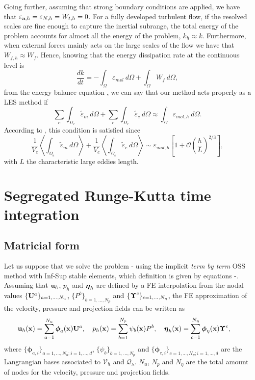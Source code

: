 Going further, assuming that strong boundary conditions are applied, we have that $ \varepsilon_{{\bf a},h}=\varepsilon_{N,h}=W_{t,h}=0 $. For a fully developed turbulent flow, if the resolved scales are fine enough to capture the inertial subrange, the total energy of the problem accounts for almost all the energy of the problem, $ k_h\approx k $. Furthermore, when external forces mainly acts on the large scales of the flow we have that $ W_{f,h}\approx W_f $. Hence, knowing that the energy dissipation rate at the continuous level is
$$ \frac{dk}{dt}=-\int_{\Omega}\varepsilon_{mol}\ d\Omega+\int_{\Omega}W_{f}\ d\Omega, $$
from the energy balance equation , we can say that our method acts properly as a LES method if
$$ \sum_e\int_{\Omega_e}\widetilde{\varepsilon}_m\ d\Omega+\sum_e\int_{\Omega_e}\widetilde{\varepsilon}_c\ d\Omega\approx\int_{\Omega}\varepsilon_{mol,h}\ d\Omega. $$
According to \cite{guasch_statistical_2013}, this condition is satisfied since 
$$ \frac{1}{V_e}\left\langle\int_{\Omega_e}\widetilde{\varepsilon}_m\ d\Omega\right\rangle + \frac{1}{V_e}\left\langle\int_{\Omega_e}\widetilde{\varepsilon}_c\ d\Omega\right\rangle\sim\varepsilon_{mol,h}\left[1+\mathcal{O}\left(\frac{h}{L}\right)^{2/3}\right], $$
with $ L $ the characteristic large eddies length.

\section{Segregated Runge-Kutta time integration}
\label{sec-C7_SRK}
\subsection{Matricial form}
Let us suppose that we solve the problem - using the implicit \textit{term by term} OSS method with Inf-Sup stable elements, which definition is given by equations -. Assuming that ${\bf u}_h$, $p_h$ and $\boldsymbol{\eta}_h$ are defined by a FE interpolation from the nodal values $\{{\bf U}^a\}_{a=1,...,N_u}$, $\{P^b\}_{b=1,...,N_p}$ and $\{\boldsymbol{\Upsilon}^c\}_{c=1,...,N_\eta}$, the FE approximation of the velocity, pressure and projection fields can be written as
\begin{align*}
&{\bf u}_h({\bf x})=\sum_{a=1}^{N_u}\boldsymbol{\phi}_a({\bf x}){\bf U}^a,\quad p_h({\bf x})=\sum_{b=1}^{N_p}\psi_b({\bf x})P^b,\quad \boldsymbol{\eta}_h({\bf x})=\sum_{c=1}^{N_\eta}\boldsymbol{\phi}_\eta({\bf x})\boldsymbol{\Upsilon}^c,
\end{align*}
where $\{\boldsymbol{\phi}_{a,i}\}_{a=1,...,N_u;i=1,...,d}$, $\{\psi_b\}_{b=1,...,N_p}$ and $\{\boldsymbol{\phi}_{c,i}\}_{c=1,...,N_\eta;i=1,...,d}$ are the Langrangian bases associated to $\mathcal{V}_h$ and $\mathcal{Q}_h$. $N_u$, $N_p$ and $N_\eta$ are the total amount of nodes for the velocity, pressure and projection fields. 

